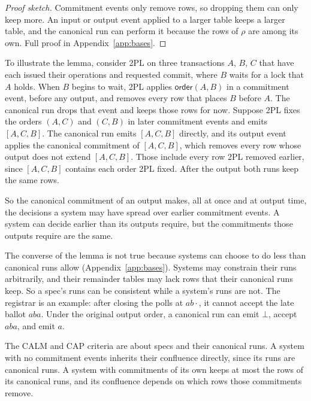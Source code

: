 \documentclass[sigconf]{cidr-2027}
\theoremstyle{remark}
\newcommand{\commitment}{commitment\xspace}
\newcommand{\commitments}{commitments\xspace}
\newcommand{\Commitment}{Commitment\xspace}
\newcommand{\outrelbase}{extend\xspace}       %
\begin{document}
\begin{proof}[Proof sketch]
\Commitment events only remove rows, so dropping them can only keep more. An
input or output event applied to a larger table keeps a larger table, and the
canonical run can perform it because the rows of $\rho$ are among its
own. Full proof in
Appendix~\ref{app:bases}.
\end{proof}

To illustrate the lemma, consider 2PL on three transactions $A$, $B$, $C$ that
have each issued their operations and requested commit, where $B$ waits for a
lock that $A$ holds. When $B$ begins to wait, 2PL applies
$\mathsf{order}(A,B)$ in a \commitment event, before any output, and removes
every row that places $B$ before $A$. The canonical run drops that event and
keeps those rows for now. Suppose 2PL fixes the orders $(A,C)$ and $(C,B)$ in
later \commitment events and emits $[A,C,B]$. The canonical run emits
$[A,C,B]$ directly, and its output event applies the canonical \commitment of
$[A,C,B]$, which removes every row whose output does not \outrelbase
$[A,C,B]$. Those include every row 2PL removed earlier, since $[A,C,B]$
contains each order 2PL fixed. After the output both runs keep the same rows.

So the canonical \commitment of an output makes, all at once and at output
time, the decisions a system may have spread over earlier \commitment events. A system can decide earlier than its outputs require, but the \commitments
those outputs require are the same.

\textcolor{reviewed}{The converse of the lemma is not true because systems can choose to do less
than canonical runs allow (Appendix~\ref{app:bases}).} \textcolor{reviewed}{Systems may constrain their runs arbitrarily, and
their remainder tables may lack rows that their canonical runs keep.} \textcolor{reviewed}{So a spec's runs
can be consistent while a system's runs are not.} \textcolor{reviewed}{The registrar is an example:
after closing the polls at $ab\cdot$, it cannot accept the late ballot $aba$.} \textcolor{reviewed}{Under the original output order, a canonical run can emit $\bot$, accept
$aba$, and emit $a$.}

\textcolor{reviewed}{The CALM and CAP criteria are about specs and
their canonical runs.} \textcolor{reviewed}{A system with no \commitment events inherits their
confluence directly, since its runs are canonical runs.} \textcolor{reviewed}{A system with
\commitments of its own keeps at most the rows of its canonical runs, and its
confluence depends on which rows those \commitments remove.}
\end{document}
